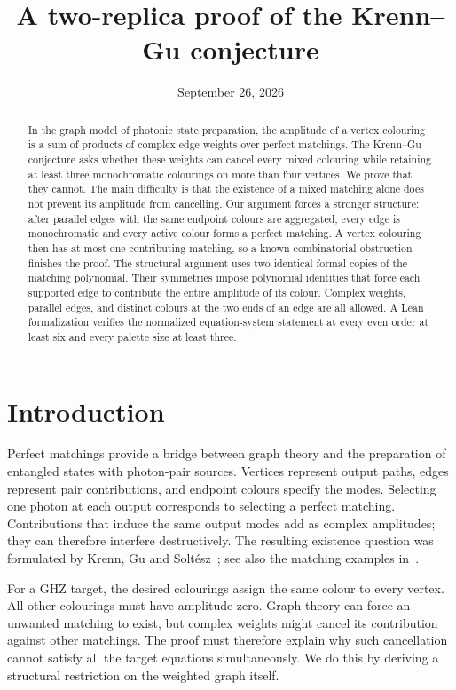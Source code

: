 \documentclass[11pt]{article}
\title{A two-replica proof of the Krenn--Gu conjecture}
\author{}
\date{September 26, 2026}
\theoremstyle{definition}
\theoremstyle{plain}
\numberwithin{equation}{section}
\begin{document}
\maketitle
\begin{abstract}
In the graph model of photonic state preparation, the amplitude of a vertex
colouring is a sum of products of complex edge weights over perfect matchings.
The Krenn--Gu conjecture asks whether these weights can cancel every mixed
colouring while retaining at least three monochromatic colourings on more
than four vertices. We prove that they cannot. The main difficulty is that
the existence of a mixed matching alone does not prevent its amplitude from
cancelling. Our argument forces a stronger structure: after parallel edges
with the same endpoint colours are aggregated, every edge is monochromatic
and every active colour forms a perfect matching. A vertex colouring then
has at most one contributing matching, so a known combinatorial obstruction
finishes the proof. The structural argument uses two identical formal copies
of the matching polynomial. Their symmetries impose polynomial identities
that force each supported edge to contribute the entire amplitude of its
colour. Complex weights, parallel edges, and distinct colours at the two
ends of an edge are all allowed. A Lean formalization verifies the normalized
equation-system statement at every even order at least six and every palette
size at least three.
\end{abstract}

\section{Introduction}\label{sec:introduction}

Perfect matchings provide a bridge between graph theory and the preparation
of entangled states with photon-pair sources. Vertices represent output paths,
edges represent pair contributions, and endpoint colours specify the modes.
Selecting one photon at each output corresponds to selecting a perfect
matching. Contributions that induce the same output modes add as complex
amplitudes; they can therefore interfere destructively. The resulting
existence question was formulated by Krenn, Gu and
Solt\'esz~\cite[Question~1]{kgs}; see also the matching examples
in~\cite[Section~2]{logic}.

For a GHZ target, the desired colourings assign the same colour to every
vertex. All other colourings must have amplitude zero. Graph theory can
force an unwanted matching to exist, but complex weights might cancel its
contribution against other matchings. The proof must therefore explain why
such cancellation cannot satisfy all the target equations simultaneously.
We do this by deriving a structural restriction on the weighted graph itself.
\end{document}
